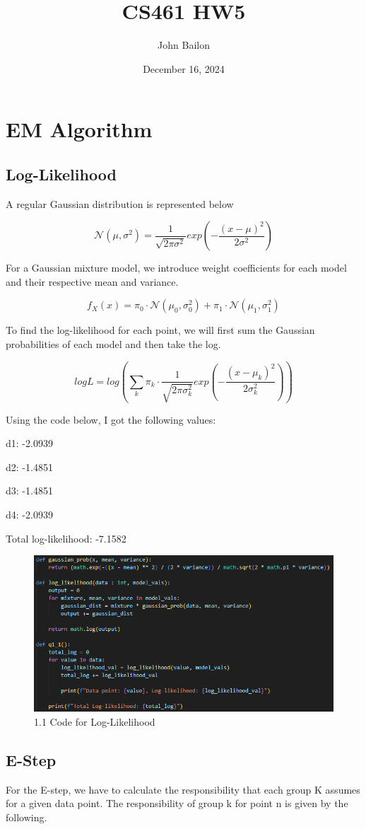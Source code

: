\documentclass{article}
\title{CS461 HW5}
\author{John Bailon}
\date{December 16, 2024}
\begin{document}
\maketitle
\section{EM Algorithm}
\subsection{Log-Likelihood}
A regular Gaussian distribution is represented below

\[\mathcal{N}(\mu, \sigma^2) = \frac{1}{\sqrt{2\pi\sigma^2}}exp(-\frac{(x-\mu)^2}{2\sigma^2})\]

For a Gaussian mixture model, we introduce weight coefficients for each model and their respective mean and variance.

\[f_{X}(x) = \pi_0 \cdot \mathcal{N}(\mu_0, \sigma_0^2) + \pi_1 \cdot \mathcal{N}(\mu_1, \sigma_1^2)\]

To find the log-likelihood for each point, we will first sum the Gaussian probabilities of each model and then take the log.

\[log L = log (\sum_{k} \pi_k \cdot \frac{1}{\sqrt{2\pi\sigma_k^2}}exp(-\frac{(x-\mu_k)^2}{2\sigma_k^2}))\]

Using the code below, I got the following values:

d1: -2.0939

d2: -1.4851

d3: -1.4851

d4: -2.0939

Total log-likelihood: -7.1582

\begin{figure}[H]
    \centering
    \includegraphics[width=0.8\linewidth]{Q1.1 Code.png}
    \caption{1.1 Code for Log-Likelihood}
\end{figure}

\subsection{E-Step}
For the E-step, we have to calculate the responsibility that each group K assumes for a given data point. The responsibility of group k for point n is given by the following.
\end{document}
